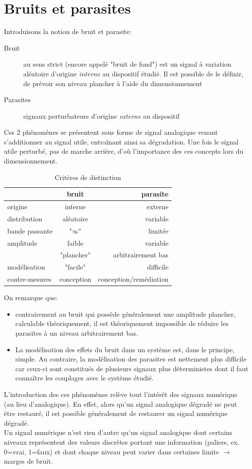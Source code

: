 \chapter{Bruits et parasites}
Introduisons la notion de  bruit et parasite:
\begin{description}
	\item[Bruit] au sens strict (encore appelé "bruit de fond") est un signal à variation aléatoire d'origine \emph{interne} au dispositif étudié. Il est possible de le définir, de prévoir son niveau plancher à l'aide du dimensionnement
	\item[Parasites] signaux perturbateurs d'origine \emph{externe} au dispositif
\end{description}
Ces 2 phénomènes se présentent sous forme de signal analogique venant s'additionner au signal utile, entraînant ainsi sa dégradation. Une fois le signal utile perturbé, pas de marche arrière, d'où l'importance des ces concepts lors du dimensionnement.
\begin{table}[H]
	\centering
	\begin{tabular}{lcr}
		& \textbf{bruit} & \textbf{parasite} \\ \hline
		origine & interne & externe \\
		distribution & aléatoire & variable \\
		bande passante & "\(\infty\)" & limitée \\
		amplitude & faible & variable \\
		& "plancher" & arbitrairement bas \\
		modélisation & "facile" & difficile \\
		contre-mesures & conception & conception/remédiation \\ \hline
 	\end{tabular}
	\caption{Critères de distinction}
\end{table}
On remarque que:
\begin{itemize}
	\item contrairement au bruit qui possède généralement une amplitude plancher, calculable théoriquement, il est théoriquement impossible de réduire les parasites à un niveau arbitrairement bas.
	\item La modélisation des effets du bruit dans un système est, dans le principe, simple. Au contraire, la modélisation des parasites est nettement plus difficile car ceux-ci sont constitués de plusieurs signaux plus déterministes dont il faut connaître les couplages avec le système étudié.
\end{itemize}
L'introduction des ces phénomènes relève tout l'intérêt des signaux numérique (au lieu d'analogique). En effet, alors qu'un signal analogique dégradé ne peut être restauré, il est possible généralement de restaurer un signal numérique dégradé.\\
Un signal numérique n'est rien d'autre qu'un signal analogique dont certains niveaux représentent des valeurs discrètes portant une information (paliers, ex. 0=vrai, 1=faux) et dont chaque niveau peut varier dans certaines limite \(\rightarrow\) marges de bruit.\\

